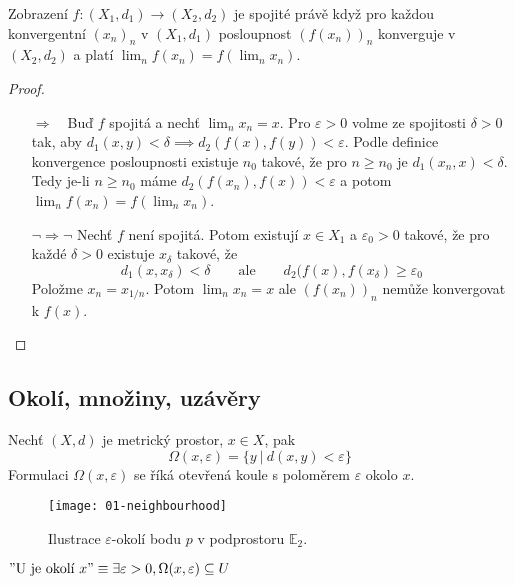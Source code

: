 \documentclass[../main.tex]{subfiles}
\begin{document}
\begin{theorem}
	Zobrazení $f: (X_1,d_1) \rightarrow (X_2,d_2)$ je spojité právě když pro každou konvergentní $(x_n)_n$ v $(X_1,d_1)$ 
	posloupnost $(f(x_n))_n$ konverguje v $(X_2,d_2)$ a platí $\lim_n f(x_n) = f(\lim_n x_n)$.
\end{theorem}

\begin{proof}
	\hfill %
	\begin{itemize}
		\item[$\Rightarrow \phantom{\lnot}$] Buď $f$ spojitá a nechť $\lim_nx_n = x$. Pro $\varepsilon > 0$ volme ze spojitosti $\delta > 0$
		tak, aby $d_1(x,y) <\delta \implies d_2(f(x),f(y)) <\varepsilon$.
		Podle definice konvergence posloupnosti existuje $n_0$ takové, že pro $n \ge n_0$ je $d_1(x_n,x) < \delta$. Tedy je-li $n \ge n_0$
		máme $d_2(f(x_n),f(x)) < \varepsilon$ a potom $\lim_n f(x_n) = f(\lim_n x_n)$.
		\item[$\lnot \Rightarrow  \lnot$] Nechť $f$ není spojitá.
		Potom existují $x \in X_1$ a $\varepsilon_0 > 0$ takové, že pro každé $\delta > 0$ existuje $x_\delta$ takové, že
		$$d_1(x, x_\delta) < \delta \qquad \text{ale} \qquad d_2(f(x), f(x_\delta) \ge \varepsilon_0$$
		Položme $x_n = x_{1/n}$. Potom $\lim_n x_n = x$ ale $(f(x_n))_n$ nemůže konvergovat k $f(x)$.
	\end{itemize}
\end{proof}



\subsection{Okolí, množiny, uzávěry}
\begin{definition}[Okolí]
	Nechť $(X,d)$ je metrický prostor, $x\in X$, pak
	$$\Omega (x,\varepsilon) = \{ y\ |\ d(x,y) < \varepsilon \}$$
	Formulaci $\Omega (x,\varepsilon)$ se říká otevřená koule s poloměrem $\varepsilon$ okolo $x$.
\end{definition}

\begin{figure}[h]
	\centering
	\texttt{[image: 01-neighbourhood]}%
	\caption{Ilustrace \(\varepsilon\)-okolí bodu \(p\) v podprostoru \(\mathbb{E}_2\).}%
\end{figure}

\begin{example} 
	$"\textrm{U je okolí } x" \equiv \exists \varepsilon > 0, \Omega (x,\varepsilon) \subseteq U $
\end{example}
\end{document}
